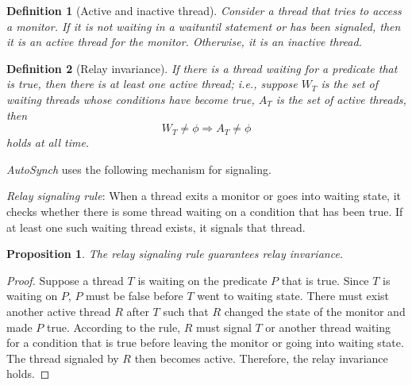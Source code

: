 \documentclass[preprint]{sigplanconf}
\newtheorem{definition}{Definition}
\newtheorem{proposition}{Proposition}
\begin{document}
\begin{definition}[Active and inactive thread] 
    Consider a thread that tries to access a monitor. If it is not waiting in a
    {\em waituntil} statement or has been signaled, then it is an {\em active} 
    thread for the monitor. Otherwise, it is an {\em inactive} thread. 
\end{definition}

\begin{definition}[Relay invariance]
    If there is a thread waiting for a predicate that is true, then there is at
    least one active thread; i.e., suppose $W_T$ is the set of waiting threads
    whose conditions have become true, $A_T$ is the set of active threads,
    then
    \[
        W_T \ne \phi \Rightarrow A_T \ne \phi 
    \]
    holds at all time. 
\end{definition}

{\em AutoSynch} uses the following mechanism for signaling.

{\em Relay signaling rule}: When a thread exits a monitor or goes into waiting 
    state, it checks whether there is some thread waiting on a condition that 
    has been true. If at least one such waiting thread exists, it signals that 
    thread.
    
\begin{proposition} \label{pro:relay_signal}
     The relay signaling rule guarantees relay invariance. 
\end{proposition}
\begin{proof}
    Suppose a thread $T$ is waiting on the predicate $P$ that is true. Since 
    $T$ is waiting 
    on $P$, $P$ must be false before $T$ went to waiting state. There must 
    exist another active thread $R$ after $T$ such that $R$ changed the state 
    of the monitor and made  $P$ true. According to the rule, $R$ must signal
    $T$ or another thread waiting for a condition that is true before leaving the
    monitor or going into waiting state. The thread signaled by $R$ then
    becomes active. Therefore, the relay invariance holds. 
 
 \end{proof}
\end{document}
